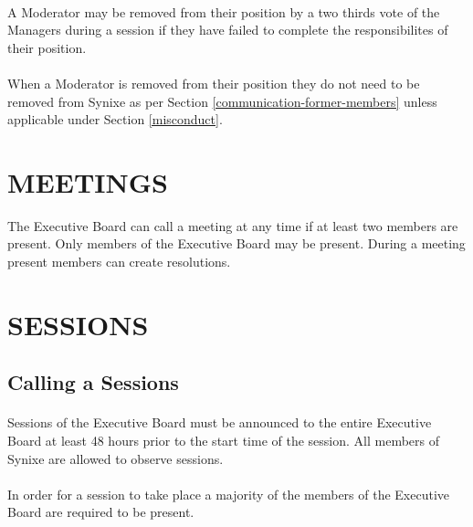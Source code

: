 \documentclass[10pt,a4paper]{article}
\begin{document}
\paragraph{}
A Moderator may be removed from their position by a two thirds vote of the Managers during a session if they have failed to complete the responsibilites of their position.
\paragraph{}
When a Moderator is removed from their position they do not need to be removed from Synixe as per Section \ref{communication-former-members} unless applicable under Section \ref{misconduct}.
\section{MEETINGS}
The Executive Board can call a meeting at any time if at least two members are present. Only members of the Executive Board may be present. During a meeting present members can create resolutions.
\section{SESSIONS}
\subsection{Calling a Sessions}
\paragraph{}
Sessions of the Executive Board must be announced to the entire Executive Board at least 48 hours prior to the start time of the session. All members of Synixe are allowed to observe sessions.
\paragraph{}
In order for a session to take place a majority of the members of the Executive Board are required to be present.
\end{document}
